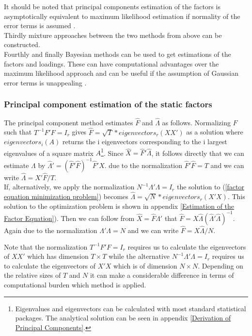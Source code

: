 \documentclass[12pt]{article}
\begin{document}
It should be noted that principal components estimation of the factors is asymptotically equivalent to maximum likelihood estimation if normality of the error terms is assumed \citep{bai2003inferential}. \\
Thirdly mixture approaches between the two methods from above can be constructed. \\
Fourthly and finally Bayesian methods can be used to get estimations of the factors and loadings. These can have computational advantages over the maximum likelihood approach and can be useful if the assumption of Gaussian error terms is unappealing \citep{stock2011dynamic}. \\

\subsubsection{Principal component estimation of the static factors}
The principal component method estimates $\hat F$ and $\hat \Lambda$ as follows. Normalizing $F$ such that $T^{-1}F'F = I_r$ gives $\hat F = \sqrt{T} * eigenvectors_r(XX')$ as a solution where $eigenvectors_i(A)$ returns the i eigenvectors corresponding to the i largest eigenvalues of a square matrix $A$\footnote{Eigenvalues and eigenvectors can be calculated with most standard statistical packages. The analytical solution can be seen in appendix \ref{Derivation of Principal Components}.}. Since $\hat X = \hat F' \hat \Lambda$, it follows directly that we can estimate $\Lambda$ by $\hat \Lambda' = (\hat F' \hat F)^{-1} \hat F'X$. due to the normalization $\hat F' \hat F = T$ and we can write $\hat \Lambda = X' \hat F / T$. \\
If, alternatively, we apply the normalization $N^{-1}\Lambda'\Lambda = I_r$ the solution to (\ref{factor equation minimization problem}) becomes $\hat \Lambda = \sqrt{N} * eigenvectors_r(X'X)$. This solution to the optimization problem is shown in appendix \ref{Estimation of the Factor Equation}). Then we can follow from $\hat X = \hat F \hat \Lambda'$ that $\hat F = X \hat \Lambda (\hat \Lambda' \hat \Lambda)^{-1}$. Again due to the normalization $\Lambda' \Lambda = N$ and we can write $\hat F = X \hat \Lambda / N$.

Note that the normalization $T^{-1}F'F = I_r$ requires us to calculate the eigenvectors of $XX'$ which has dimension $T \times T$ while the alternative $N^{-1}\Lambda'\Lambda = I_r$ requires us to calculate the eigenvectors of $X'X$ which is of dimension $N \times N$. Depending on the relative sizes of $T$ and $N$ it can make a considerable difference in terms of computational burden which method is applied. \\
\end{document}
